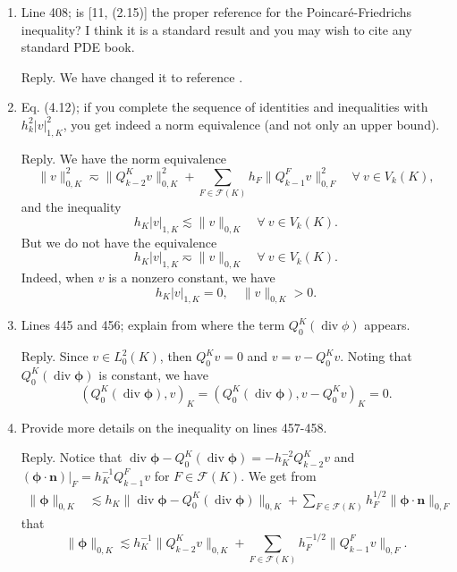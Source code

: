 \documentclass[10pt]{amsart}
\theoremstyle{definition}
\theoremstyle{remark}
\renewcommand{\div}{\operatorname{div}}
\begin{document}
\begin{enumerate}[1.]
\medskip

\item \textsf{Line 408; is [11, (2.15)] the proper reference for the Poincar\'e-Friedrichs inequality? I think it is a standard result and you may wish to cite any standard PDE book.}

\smallskip \noindent \textcolor[rgb]{1.00,0.00,0.00}{Reply.}
We have changed it to reference \cite{Necas1967}.

\medskip

\item \textsf{Eq. (4.12); if you complete the sequence of identities and inequalities with $h_k^2|v|_{1,K}^2$, you get indeed a norm equivalence (and not only an upper bound).}

\smallskip \noindent \textcolor[rgb]{1.00,0.00,0.00}{Reply.}
We have the norm equivalence
\[
\|v\|_{0,K}^2\eqsim \|Q_{k-2}^Kv\|_{0,K}^2+\sum_{F\in\mathcal F(K)}h_F\|Q_{k-1}^Fv\|_{0,F}^2 \quad\forall~v\in V_k(K),
\]
and the inequality
\[
h_K|v|_{1,K}\lesssim \|v\|_{0,K}\quad\forall~v\in V_k(K).
\]
But we do not have 
the equivalence
\[
h_K|v|_{1,K}\eqsim \|v\|_{0,K}\quad\forall~v\in V_k(K).
\]
Indeed, when $v$ is a nonzero constant, we have
$$
h_K|v|_{1,K}=0,\quad \|v\|_{0,K}>0.
$$ 

\medskip

\item \textsf{Lines 445 and 456; explain from where the term $Q_0^K(\div\phi)$ appears.}

\smallskip \noindent \textcolor[rgb]{1.00,0.00,0.00}{Reply.}
Since $v\in L_0^2(K)$, then $Q_{0}^Kv=0$ and $v=v-Q_{0}^Kv$. Noting that $Q_{0}^K(\div\boldsymbol{\phi})$ is constant, we have
$$
(Q_{0}^K(\div\boldsymbol{\phi}), v)_K=(Q_{0}^K(\div\boldsymbol{\phi}), v-Q_{0}^Kv)_K=0.
$$

\medskip

\item \textsf{Provide more details on the inequality on lines 457-458.}

\smallskip \noindent \textcolor[rgb]{1.00,0.00,0.00}{Reply.}
Notice that $\div\boldsymbol{\phi}-Q_{0}^K(\div\boldsymbol{\phi})=-h_K^{-2}Q_{k-2}^Kv$ and $(\boldsymbol{\phi}\cdot\boldsymbol{n})|_{F}=h_K^{-1}Q_{k-1}^Fv$ for $F\in\mathcal F(K)$.
We get from 
\begin{align*}
\|\boldsymbol{\phi}\|_{0,K}%
&\lesssim h_K\|\div\boldsymbol{\phi}-Q_0^K(\div\boldsymbol{\phi})\|_{0,K} +\sum_{F\in\mathcal F(K)}h_F^{1/2}\|\boldsymbol{\phi}\cdot\boldsymbol{n}\|_{0,F}
\end{align*}
that
\[
\|\boldsymbol{\phi}\|_{0,K}\lesssim h_K^{-1}\|Q_{k-2}^Kv\|_{0,K} +\sum_{F\in\mathcal F(K)}h_F^{-1/2}\|Q_{k-1}^Fv\|_{0,F}.
\]



\end{enumerate}
\end{document}
